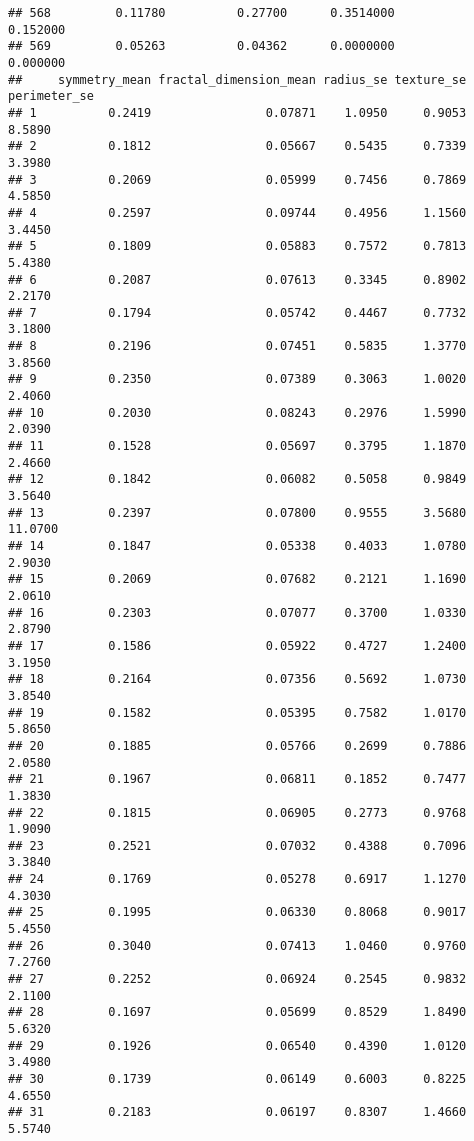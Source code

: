 \documentclass[
]{article}
\begin{document}
\begin{verbatim}
## 568         0.11780          0.27700      0.3514000            0.152000
## 569         0.05263          0.04362      0.0000000            0.000000
##     symmetry_mean fractal_dimension_mean radius_se texture_se perimeter_se
## 1          0.2419                0.07871    1.0950     0.9053       8.5890
## 2          0.1812                0.05667    0.5435     0.7339       3.3980
## 3          0.2069                0.05999    0.7456     0.7869       4.5850
## 4          0.2597                0.09744    0.4956     1.1560       3.4450
## 5          0.1809                0.05883    0.7572     0.7813       5.4380
## 6          0.2087                0.07613    0.3345     0.8902       2.2170
## 7          0.1794                0.05742    0.4467     0.7732       3.1800
## 8          0.2196                0.07451    0.5835     1.3770       3.8560
## 9          0.2350                0.07389    0.3063     1.0020       2.4060
## 10         0.2030                0.08243    0.2976     1.5990       2.0390
## 11         0.1528                0.05697    0.3795     1.1870       2.4660
## 12         0.1842                0.06082    0.5058     0.9849       3.5640
## 13         0.2397                0.07800    0.9555     3.5680      11.0700
## 14         0.1847                0.05338    0.4033     1.0780       2.9030
## 15         0.2069                0.07682    0.2121     1.1690       2.0610
## 16         0.2303                0.07077    0.3700     1.0330       2.8790
## 17         0.1586                0.05922    0.4727     1.2400       3.1950
## 18         0.2164                0.07356    0.5692     1.0730       3.8540
## 19         0.1582                0.05395    0.7582     1.0170       5.8650
## 20         0.1885                0.05766    0.2699     0.7886       2.0580
## 21         0.1967                0.06811    0.1852     0.7477       1.3830
## 22         0.1815                0.06905    0.2773     0.9768       1.9090
## 23         0.2521                0.07032    0.4388     0.7096       3.3840
## 24         0.1769                0.05278    0.6917     1.1270       4.3030
## 25         0.1995                0.06330    0.8068     0.9017       5.4550
## 26         0.3040                0.07413    1.0460     0.9760       7.2760
## 27         0.2252                0.06924    0.2545     0.9832       2.1100
## 28         0.1697                0.05699    0.8529     1.8490       5.6320
## 29         0.1926                0.06540    0.4390     1.0120       3.4980
## 30         0.1739                0.06149    0.6003     0.8225       4.6550
## 31         0.2183                0.06197    0.8307     1.4660       5.5740

\end{verbatim}
\end{document}

